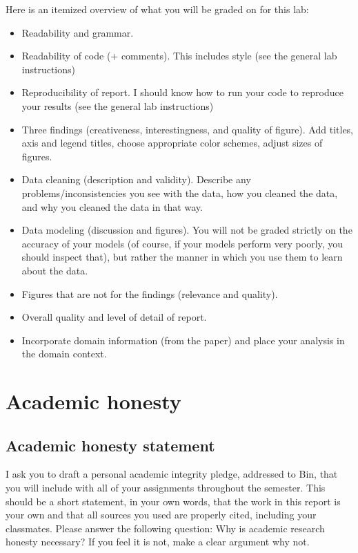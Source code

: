 \documentclass[10pt,letterpaper]{article}
\begin{document}
Here is an itemized overview of what you will be graded on for this lab:
\begin{itemize}
    \item Readability and grammar.
    \item Readability of code (+ comments). This includes style (see the general lab instructions)
    \item Reproducibility of report. I should know how to run your code to reproduce your results (see the general lab instructions)
    \item Three findings (creativeness, interestingness, and quality of figure). Add titles, axis and legend titles, choose appropriate color schemes, adjust sizes of figures.
    \item Data cleaning (description and validity). Describe any problems/inconsistencies you see with the data, how you cleaned the data, and why you cleaned the data in that way.
    \item Data modeling (discussion and figures). You will not be graded strictly on the accuracy of your models (of course, if your models perform very poorly, you should inspect that), but rather the manner in which you use them to learn about the data. 
    \item Figures that are not for the findings (relevance and quality).
    \item Overall quality and level of detail of report.
    \item Incorporate domain information (from the paper) and place your analysis in the domain context.
\end{itemize}

\section*{Academic honesty}

\subsection*{Academic honesty statement}

I ask you to draft a personal academic integrity pledge, addressed to Bin, that you will include with all of your assignments throughout the semester. This should be a short statement, in your own words, that the work in this report is your own and that all sources you used are properly cited, including your classmates. Please answer the following question: Why is academic research honesty necessary? If you feel it is not, make a clear argument why not.
\end{document}
